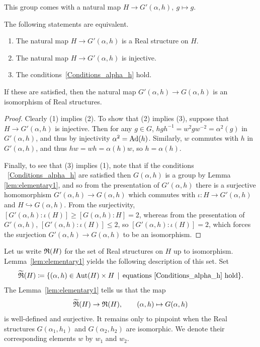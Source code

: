 This group comes with a natural map $H\rightarrow G' (\alpha, h), \ g\mapsto g$. 
\begin{cor}\label{cor:elementary} The following statements are equivalent.
\begin{enumerate}  
\item The natural map $H\rightarrow G' (\alpha, h)$ is a Real structure on $H$.
\item The natural map $H\rightarrow G' (\alpha, h)$ is injective.
\item The conditions~\eqref{Conditions_alpha_h} hold.
\end{enumerate} 
If these are satisfied, then the natural map $G'(\alpha, h) \rightarrow G(\alpha, h)$ is an isomorphism of Real structures.
\end{cor}

\begin{proof}
  Clearly (1) implies (2). To show that (2) implies (3), suppose that $H\rightarrow G' (\alpha, h)$ is injective. Then for any $g \in G$, $hgh^{-1} = w^2 g w^{-2} = \alpha^2(g)$ in $G'(\alpha, h)$, and thus by injectivity $\alpha^2 = \operatorname{Ad}(h)$. Similarly, $w$ commutes with $h$ in $G'(\alpha, h)$, and thus $hw = wh = \alpha(h)w$, so $h = \alpha(h)$.
  
  Finally, to see that (3) implies (1), note that if the conditions ~\eqref{Conditions_alpha_h} are satisfied then $G(\alpha, h)$ is a group by Lemma \ref{lem:elementary1}, and so from the presentation of $G'(\alpha,h)$ there is a surjective homomorphism $G'(\alpha,h) \rightarrow G(\alpha,h)$ which commutes with $\iota \colon H \rightarrow G'(\alpha,h)$ and $H \hookrightarrow G(\alpha,h)$. From the surjectivity, $[G'(\alpha,h) : \iota(H)] \geq [G(\alpha,h): H] = 2$, whereas from the presentation of $G'(\alpha,h)$, $[G'(\alpha,h) : \iota(H)] \leq 2$, so $[G'(\alpha,h) : \iota(H)] = 2$, which forces the surjection $G'(\alpha,h) \rightarrow G(\alpha,h)$ to be an isomorphism.
\end{proof}

Let us write ${\mathfrak R}(H)$ for the set of Real structures on $H$ up to isomorphism.
Lemma~\ref{lem:elementary1} yields the following description of this set. Set
\[
  \widetilde{{\mathfrak R}}(H) \coloneqq \{ (\alpha,h)\in \operatorname{Aut}(H)\times H \,\mid\, \mbox{equations }\eqref{Conditions_alpha_h}\mbox{ hold}\}.
\]
The Lemma~\ref{lem:elementary1} tells us that the map
\[
\widetilde{{\mathfrak R}}(H) \rightarrow {\mathfrak R}(H), \qquad (\alpha, h) \mapsto G(\alpha, h)
\]
is well-defined and surjective. It remains only to pinpoint when the Real structures $G(\alpha_1, h_1)$ and $G(\alpha_2, h_2)$ are isomorphic. 
We denote their corresponding elements $w$ by $w_1$ and $w_2$.

